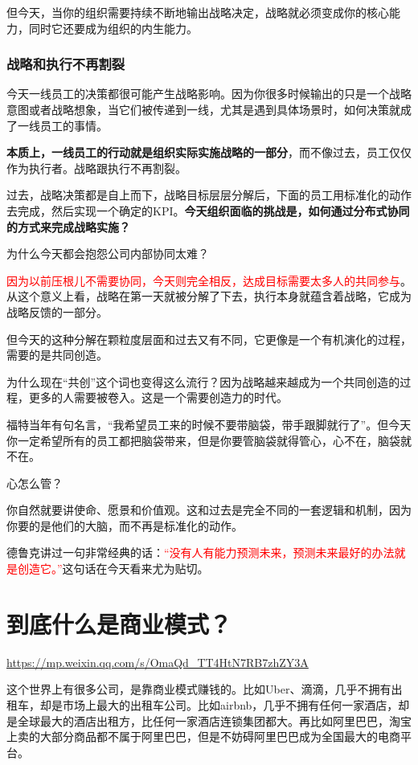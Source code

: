 \documentclass[12pt]{article}
\begin{document}
但今天，当你的组织需要持续不断地输出战略决定，战略就必须变成你的核心能力，同时它还要成为组织的内生能力。

\subsubsection{战略和执行不再割裂}
今天一线员工的决策都很可能产生战略影响。因为你很多时候输出的只是一个战略意图或者战略想象，当它们被传递到一线，尤其是遇到具体场景时，如何决策就成了一线员工的事情。

\textbf{本质上，一线员工的行动就是组织实际实施战略的一部分}，而不像过去，员工仅仅作为执行者。战略跟执行不再割裂。

过去，战略决策都是自上而下，战略目标层层分解后，下面的员工用标准化的动作去完成，然后实现一个确定的KPI。\textbf{今天组织面临的挑战是，如何通过分布式协同的方式来完成战略实施？}

为什么今天都会抱怨公司内部协同太难？

\textcolor{red}{因为以前压根儿不需要协同，今天则完全相反，达成目标需要太多人的共同参与}。从这个意义上看，战略在第一天就被分解了下去，执行本身就蕴含着战略，它成为战略反馈的一部分。

但今天的这种分解在颗粒度层面和过去又有不同，它更像是一个有机演化的过程，需要的是共同创造。

为什么现在“共创”这个词也变得这么流行？因为战略越来越成为一个共同创造的过程，更多的人需要被卷入。这是一个需要创造力的时代。

福特当年有句名言，“我希望员工来的时候不要带脑袋，带手跟脚就行了”。但今天你一定希望所有的员工都把脑袋带来，但是你要管脑袋就得管心，心不在，脑袋就不在。

心怎么管？

你自然就要讲使命、愿景和价值观。这和过去是完全不同的一套逻辑和机制，因为你要的是他们的大脑，而不再是标准化的动作。

德鲁克讲过一句非常经典的话：\textcolor{red}{“没有人有能力预测未来，预测未来最好的办法就是创造它。”}这句话在今天看来尤为贴切。

\section{到底什么是商业模式？}
\url{https://mp.weixin.qq.com/s/OmaQd_TT4HtN7RB7zhZY3A}

这个世界上有很多公司，是靠商业模式赚钱的。比如Uber、滴滴，几乎不拥有出租车，却是市场上最大的出租车公司。比如airbnb，几乎不拥有任何一家酒店，却是全球最大的酒店出租方，比任何一家酒店连锁集团都大。再比如阿里巴巴，淘宝上卖的大部分商品都不属于阿里巴巴，但是不妨碍阿里巴巴成为全国最大的电商平台。
\end{document}
